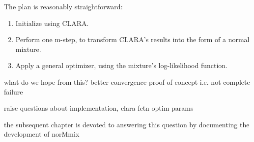 The plan is reasonably straightforward:

\begin{enumerate}
    \item Initialize using CLARA.
    \item Perform one m-step, to transform CLARA's results into the form of a 
        normal mixture.
    \item Apply a general optimizer, using the mixture's log-likelihood function.
\end{enumerate}


what do we hope from this?
better convergence
proof of concept i.e. not complete failure

raise questions about implementation,
clara fctn
optim params

the subsequent chapter is devoted to answering this question by documenting the 
development of norMmix


